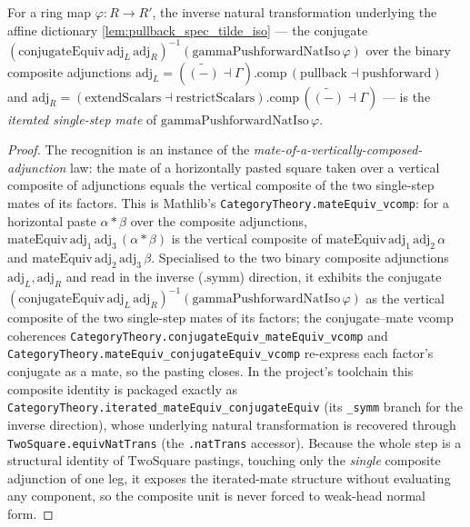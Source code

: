 \begin{lemma}


  \label{lem:ring_square_glue_pst_iterated_mate}
  For a ring map \(\varphi : R \to R'\), the inverse natural transformation underlying the affine
  dictionary \cref{lem:pullback_spec_tilde_iso} --- the conjugate
  \((\mathrm{conjugateEquiv}\,\mathrm{adj}_L\,\mathrm{adj}_R)^{-1}(\mathrm{gammaPushforwardNatIso}\,\varphi)\)
  over the binary composite adjunctions
  \(\mathrm{adj}_L = (\widetilde{(-)}\dashv\Gamma).\mathrm{comp}\,(\mathrm{pullback}\dashv\mathrm{pushforward})\)
  and
  \(\mathrm{adj}_R = (\mathrm{extendScalars}\dashv\mathrm{restrictScalars}).\mathrm{comp}\,(\widetilde{(-)}\dashv\Gamma)\)
  --- is the \emph{iterated single-step mate} of \(\mathrm{gammaPushforwardNatIso}\,\varphi\).
  \begin{proof}
    The recognition is an instance of the \emph{mate-of-a-vertically-composed-adjunction} law: the mate
    of a horizontally pasted square taken over a vertical composite of adjunctions equals the vertical
    composite of the two single-step mates of its factors. This is Mathlib's
    \texttt{CategoryTheory.mateEquiv\_vcomp}: for a horizontal paste \(\alpha \ast \beta\) over the
    composite adjunctions, \(\mathrm{mateEquiv}\,\mathrm{adj}_1\,\mathrm{adj}_3\,(\alpha \ast \beta)\)
    is the vertical composite of \(\mathrm{mateEquiv}\,\mathrm{adj}_1\,\mathrm{adj}_2\,\alpha\) and
    \(\mathrm{mateEquiv}\,\mathrm{adj}_2\,\mathrm{adj}_3\,\beta\). Specialised to the two binary
    composite adjunctions \(\mathrm{adj}_L,\mathrm{adj}_R\) and read in the inverse (\(\mathrm{.symm}\))
    direction, it exhibits the conjugate
    \((\mathrm{conjugateEquiv}\,\mathrm{adj}_L\,\mathrm{adj}_R)^{-1}(\mathrm{gammaPushforwardNatIso}\,\varphi)\)
    as the vertical composite of the two single-step mates of its factors; the conjugate--mate vcomp
    coherences \texttt{CategoryTheory.conjugateEquiv\_mateEquiv\_vcomp} and
    \texttt{CategoryTheory.mateEquiv\_conjugateEquiv\_vcomp} re-express each factor's conjugate as a
    mate, so the pasting closes. In the project's toolchain this composite identity is packaged exactly
    as \texttt{CategoryTheory.iterated\_mateEquiv\_conjugateEquiv} (its \texttt{\_symm} branch for the
    inverse direction), whose underlying natural transformation is recovered through
    \texttt{TwoSquare.equivNatTrans} (the \texttt{.natTrans} accessor). Because the whole step is a
    structural identity of \(\mathrm{TwoSquare}\) pastings, touching only the \emph{single} composite
    adjunction of one leg, it exposes the iterated-mate structure without evaluating any component, so
    the composite unit is never forced to weak-head normal form.
  \end{proof}
\end{lemma}

